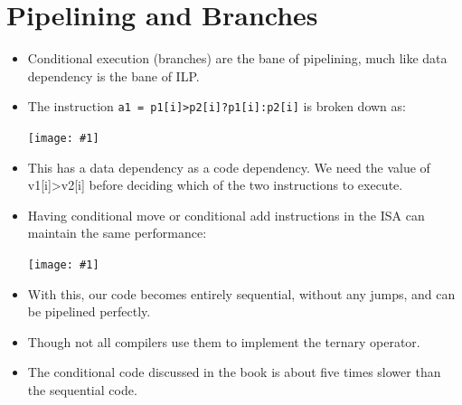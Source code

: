 \documentclass{report}
\newcommand{\mygraphic}[1]{
\begin{center}
    \texttt{[image: \#1]}
\end{center}
}
\begin{document}
\section{Pipelining and Branches}
\begin{itemize}
\item Conditional execution (branches) are the bane of pipelining, much like data dependency is the bane of ILP.
\item The instruction \texttt{a1 = p1[i]>p2[i]?p1[i]:p2[i]} is broken down as:
\mygraphic{rsrc/branches.png}
\item This has a data dependency as a code dependency. We need the value of v1[i]>v2[i] before deciding which of the two instructions to execute.
\item Having conditional move or conditional add instructions in the ISA can maintain the same performance:
\mygraphic{rsrc/cmove.png}
\item With this, our code becomes entirely sequential, without any jumps, and can be pipelined perfectly.
\item Though not all compilers use them to implement the ternary operator.
\item The conditional code discussed in the book is about five times slower than the sequential code.
\end{itemize}
\end{document}
